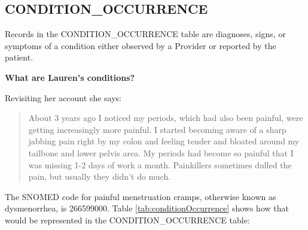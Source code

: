 \documentclass[]{book}
\begin{document}
\subsection{CONDITION\_OCCURRENCE}\label{conditionOccurrence}

Records in the CONDITION\_OCCURRENCE table are diagnoses, signs, or
symptoms of a condition either observed by a Provider or reported by the
patient.

\textbf{What are Lauren's conditions?}

Revisiting her account she says:

\begin{quote}
About 3 years ago I noticed my periods, which had also been painful,
were getting increasingly more painful. I started becoming aware of a
sharp jabbing pain right by my colon and feeling tender and bloated
around my tailbone and lower pelvis area. My periods had become so
painful that I was missing 1-2 days of work a month. Painkillers
sometimes dulled the pain, but usually they didn't do much.
\end{quote}

The SNOMED code for painful menstruation cramps, otherwise known as
dysmenorrhea, is 266599000. Table \ref{tab:conditionOccurrence} shows
how that would be represented in the CONDITION\_OCCURRENCE table:
\end{document}
